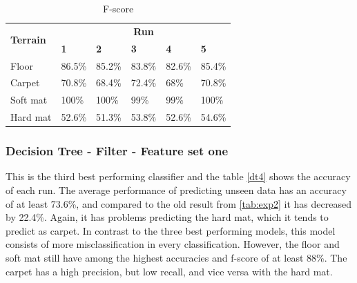 \documentclass[USenglish]{ifimaster}  %
\begin{document}
\begin{table}[h]
	\centering
	\begin{tabular}{@{}llllll@{}}
		\toprule
		\multirow{2}{*}{\textbf{Terrain}} & \multicolumn{5}{c}{\textbf{Run}} \\ \cmidrule(l){2-6} 
		& \multicolumn{1}{l|}{\textbf{1}} & \multicolumn{1}{l|}{\textbf{2}} & \multicolumn{1}{l|}{\textbf{3}} & \multicolumn{1}{l|}{\textbf{4}} & \textbf{5} \\ \midrule
		\multicolumn{1}{l|}{Floor} & \multicolumn{1}{l|}{86.5\%} & \multicolumn{1}{l|}{85.2\%} & \multicolumn{1}{l|}{83.8\%} & \multicolumn{1}{l|}{82.6\%} & 85.4\% \\ \midrule
		\multicolumn{1}{l|}{Carpet} & \multicolumn{1}{l|}{70.8\%} & \multicolumn{1}{l|}{68.4\%} & \multicolumn{1}{l|}{72.4\%} & \multicolumn{1}{l|}{68\%} & 70.8\% \\ \midrule
		\multicolumn{1}{l|}{Soft mat} & \multicolumn{1}{l|}{100\%} & \multicolumn{1}{l|}{100\%} & \multicolumn{1}{l|}{99\%} & \multicolumn{1}{l|}{99\%} & 100\% \\ \midrule
		\multicolumn{1}{l|}{Hard mat} & \multicolumn{1}{l|}{52.6\%} & \multicolumn{1}{l|}{51.3\%} & \multicolumn{1}{l|}{53.8\%} & \multicolumn{1}{l|}{52.6\%} & 54.6\% \\ \bottomrule
	\end{tabular}
	\caption{F-score}
	\label{tab:nnset5fscore}
\end{table}
\FloatBarrier
\newpage

	
\subsubsection{Decision Tree - Filter - Feature set one}
This is the third best performing classifier and the table \ref{dt4} shows the accuracy of each run. The average performance of predicting unseen data has an accuracy of at least 73.6\%, and compared to the old result from \ref{tab:exp2} it has decreased by 22.4\%. Again, it has problems predicting the hard mat, which it tends to predict as carpet. In contrast to the three best performing models, this model consists of more misclassification in every classification. However, the floor and soft mat still have among the highest accuracies and f-score of at least 88\%. The carpet has a high precision, but low recall, and vice versa with the hard mat.
\end{document}
